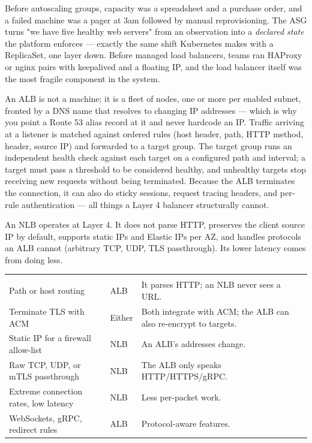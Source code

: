  Before autoscaling groups, capacity was a spreadsheet and a purchase order, and a failed machine was a pager at 3am followed by manual reprovisioning. The ASG turns "we have five healthy web servers" from an observation into a \emph{declared state} the platform enforces --- exactly the same shift Kubernetes makes with a ReplicaSet, one layer down. Before managed load balancers, teams ran HAProxy or nginx pairs with keepalived and a floating IP, and the load balancer itself was the most fragile component in the system.

 An ALB is not a machine; it is a fleet of nodes, one or more per enabled subnet, fronted by a DNS name that resolves to changing IP addresses --- which is why you point a Route 53 alias record at it and never hardcode an IP. Traffic arriving at a listener is matched against ordered rules (host header, path, HTTP method, header, source IP) and forwarded to a target group. The target group runs an independent health check against each target on a configured path and interval; a target must pass a threshold to be considered healthy, and unhealthy targets stop receiving new requests without being terminated. Because the ALB terminates the connection, it can also do sticky sessions, request tracing headers, and per-rule authentication --- all things a Layer 4 balancer structurally cannot.

An NLB operates at Layer 4. It does not parse HTTP, preserves the client source IP by default, supports static IPs and Elastic IPs per AZ, and handles protocols an ALB cannot (arbitrary TCP, UDP, TLS passthrough). Its lower latency comes from doing less.

\begin{center}\small
\wbrowcolors
\begin{tabularx}{\linewidth}{@{}L{24mm} X X@{}}
 &  & \\
Path or host routing & ALB & It parses HTTP; an NLB never sees a URL.\\
Terminate TLS with ACM & Either & Both integrate with ACM; the ALB can also re-encrypt to targets.\\
Static IP for a firewall allow-list & NLB & An ALB's addresses change.\\
Raw TCP, UDP, or mTLS passthrough & NLB & The ALB only speaks HTTP/HTTPS/gRPC.\\
Extreme connection rates, low latency & NLB & Less per-packet work.\\
WebSockets, gRPC, redirect rules & ALB & Protocol-aware features.\\
\end{tabularx}
\end{center}

